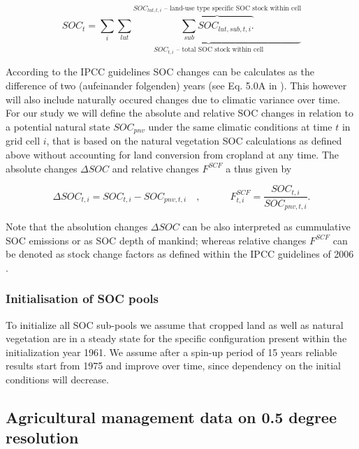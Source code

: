 \documentclass[gc, manuscript]{copernicus}
\begin{document}
\begin{equation}
SOC_{t} = \sum_{i} \underbrace{\sum_{lut} \overbrace{\sum_{sub} SOC_{lut, sub, t, i}.}^{\text{$SOC_{lut, t, i}$ -- land-use type specific SOC stock within cell}}}_{\text{$SOC_{t, i}$ -- total SOC stock within cell}}
\label{eq:totalstock}
\end{equation}

According to the IPCC guidelines SOC changes can be calculates as the difference of two (aufeinander folgenden) years (see Eq. 5.0A in \citep{ipcc_2019_2019}). This however will also include naturally occured changes due to climatic variance over time. For our study we will define the absolute and relative SOC changes in relation to a potential natural state \(SOC_{pnv}\) under the same climatic conditions at time \(t\) in grid cell \(i\), that is based on the natural vegetation SOC calculations as defined above without accounting for land conversion from cropland at any time. The absolute changes \(\Delta SOC\) and relative changes \(F^{SCF}\) a thus given by

\begin{equation}
\Delta SOC_{t, i} = SOC_{t, i} - SOC_{pnv, t, i}\quad, \qquad \quad  F^{SCF}_{t, i} = \frac{SOC_{t, i}}{SOC_{pnv, t, i}}.
\label{eq:totalstock}
\end{equation}

Note that the absolution changes \(\Delta SOC\) can be also interpreted as cummulative SOC emissions or as SOC depth of mankind; whereas relative changes \(F^{SCF}\) can be denoted as stock change factors as defined within the IPCC guidelines of 2006 \citep{ipcc_2006_2006}.

\hypertarget{initialisation-of-soc-pools}{%
\subsubsection{Initialisation of SOC pools}\label{initialisation-of-soc-pools}}

To initialize all SOC sub-pools we assume that cropped land as well as natural vegetation are in a steady state for the specific configuration present within the initialization year 1961. We assume after a spin-up period of 15 years reliable results start from 1975 and improve over time, since dependency on the initial conditions will decrease.

\newpage

\hypertarget{sec:agrimanagement}{%
\subsection{Agricultural management data on 0.5 degree resolution}\label{sec:agrimanagement}}
\end{document}
